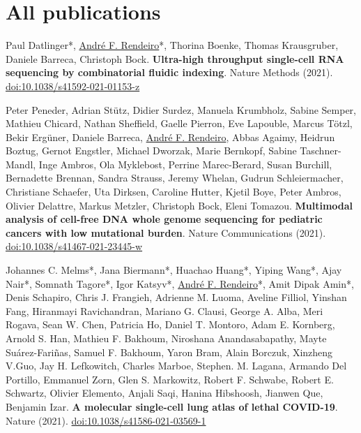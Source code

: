 \documentclass[11pt,a4paper,roman]{moderncv} %
\begin{document}
\newpage

\section{All publications}
        \begin{etaremune}[leftmargin=1.0cm, itemindent=0pt, topsep=10pt, itemsep=2pt, partopsep=0pt, parsep=0pt]

        \item Paul Datlinger*, \underline{André F. Rendeiro}*, Thorina Boenke, Thomas Krausgruber, Daniele Barreca, Christoph Bock. \textbf{Ultra-high throughput single-cell RNA sequencing by combinatorial fluidic indexing}. Nature Methods (2021). \href{https://dx.doi.org/10.1038/s41592-021-01153-z}{doi:10.1038/s41592-021-01153-z}

        \item Peter Peneder, Adrian Stütz, Didier Surdez, Manuela Krumbholz, Sabine Semper, Mathieu Chicard, Nathan Sheffield, Gaelle Pierron, Eve Lapouble, Marcus Tötzl, Bekir Ergüner, Daniele Barreca, \underline{André F. Rendeiro}, Abbas Agaimy, Heidrun Boztug, Gernot Engstler, Michael Dworzak, Marie Bernkopf, Sabine Taschner-Mandl, Inge Ambros, Ola Myklebost, Perrine Marec-Berard, Susan Burchill, Bernadette Brennan, Sandra Strauss, Jeremy Whelan, Gudrun Schleiermacher, Christiane Schaefer, Uta Dirksen, Caroline Hutter, Kjetil Boye, Peter Ambros, Olivier Delattre, Markus Metzler, Christoph Bock, Eleni Tomazou. \textbf{Multimodal analysis of cell-free DNA whole genome sequencing for pediatric cancers with low mutational burden}. Nature Communications (2021). \href{https://dx.doi.org/10.1038/s41467-021-23445-w}{doi:10.1038/s41467-021-23445-w}

        \item Johannes C. Melms*, Jana Biermann*, Huachao Huang*, Yiping Wang*, Ajay Nair*, Somnath Tagore*, Igor Katsyv*, \underline{André F. Rendeiro}*, Amit Dipak Amin*, Denis Schapiro, Chris J. Frangieh, Adrienne M. Luoma, Aveline Filliol, Yinshan Fang, Hiranmayi Ravichandran, Mariano G. Clausi, George A. Alba, Meri Rogava, Sean W. Chen, Patricia Ho, Daniel T. Montoro, Adam E. Kornberg, Arnold S. Han, Mathieu F. Bakhoum, Niroshana Anandasabapathy, Mayte Suárez-Fariñas, Samuel F. Bakhoum, Yaron Bram, Alain Borczuk, Xinzheng V.Guo, Jay H. Lefkowitch, Charles Marboe, Stephen. M. Lagana, Armando Del Portillo, Emmanuel Zorn, Glen S. Markowitz, Robert F. Schwabe, Robert E. Schwartz, Olivier Elemento, Anjali Saqi, Hanina Hibshoosh, Jianwen Que, Benjamin Izar. \textbf{A molecular single-cell lung atlas of lethal COVID-19}. Nature (2021). \href{https://dx.doi.org/10.1038/s41586-021-03569-1}{doi:10.1038/s41586-021-03569-1}


\end{etaremune}
\end{document}
